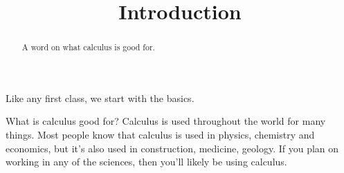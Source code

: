 \documentclass{ximera}
\title{Introduction}
\begin{document}
\begin{abstract}
A word on what calculus is good for.
\end{abstract}
\maketitle
Like any first class, we start with the basics.

What is calculus good for? Calculus is used throughout the world for many things. Most people know that calculus is used in physics, chemistry and economics, but it's also used in construction, medicine, geology. If you plan on working in any of the sciences, then you'll likely be using calculus.
\end{document}
